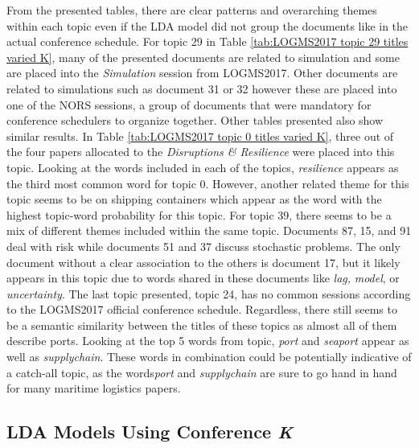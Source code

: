 \documentclass[a4paper, 12pt, twoside]{article}
\numberwithin{equation}{section} %
\begin{document}
From the presented tables, there are clear patterns and overarching themes within each topic even if the LDA model did not group the documents like in the actual conference schedule. For topic 29 in Table \ref{tab:LOGMS2017 topic 29 titles varied K}, many of the presented documents are related to simulation and some are placed into the \textit{Simulation} session from LOGMS2017. Other documents are related to simulations such as document 31 or 32 however these are placed into one of the NORS sessions, a group of documents that were mandatory for conference schedulers to organize together. Other tables presented also show similar results. In Table \ref{tab:LOGMS2017 topic 0 titles varied K}, three out of the four papers allocated to the \textit{Disruptions \& Resilience} were placed into this topic. Looking at the words included in each of the topics, \textit{resilience} appears as the third most common word for topic 0. However, another related theme for this topic seems to be on shipping containers which appear as the word with the highest topic-word probability for this topic. For topic 39, there seems to be a mix of different themes included within the same topic. Documents 87, 15, and 91 deal with risk while documents 51 and 37 discuss stochastic problems. The only document without a clear association to the others is document 17, but it likely appears in this topic due to words shared in these documents like \textit{lag,} \textit{model}, or \textit{uncertainty}. The last topic presented, topic 24, has no common sessions according to the LOGMS2017 official conference schedule. Regardless, there still seems to be a semantic similarity between the titles of these topics as almost all of them describe ports. Looking at the top 5 words from topic, \textit{port} and \textit{seaport} appear as well as \textit{supply\textunderscore chain}. These words in combination could be potentially indicative of a catch-all topic, as the words\textit{port} and \textit{supply\textunderscore chain} are sure to go hand in hand for many maritime logistics papers.


\subsection{LDA Models Using Conference \textit{K}}
\end{document}
